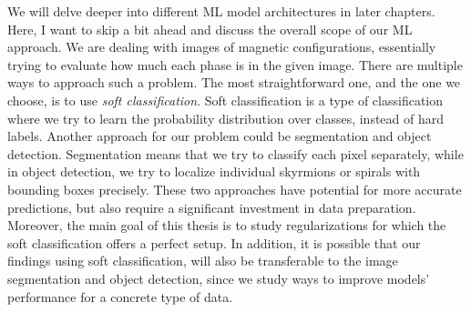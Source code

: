 We will delve deeper into different ML model architectures in later chapters. Here, I want to skip a bit ahead and discuss the overall scope of our ML approach. We are dealing with images of magnetic configurations, essentially trying to evaluate how much each phase is in the given image. There are multiple ways to approach such a problem. The most straightforward one, and the one we choose, is to use \emph{soft classification}. Soft classification is a type of classification where we try to learn the probability distribution over classes, instead of hard labels. Another approach for our problem could be segmentation and object detection. Segmentation means that we try to classify each pixel separately, while in object detection, we try to localize individual skyrmions or spirals with bounding boxes precisely. These two approaches have potential for more accurate predictions, but also require a significant investment in data preparation. Moreover, the main goal of this thesis is to study regularizations for which the soft classification offers a perfect setup. In addition, it is possible that our findings using soft classification, will also be transferable to the image segmentation and object detection, since we study ways to improve models' performance for a concrete type of data.